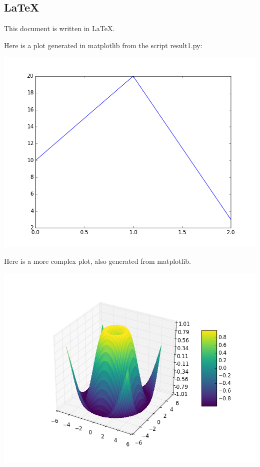 \documentclass[11pt,a4paper]{article}
\begin{document}
\subsection{LaTeX}




This document is written in \LaTeX.

Here is a plot generated in matplotlib from the script result1.py:

\includegraphics[scale=0.5]{fig/plot1.png}

Here is a more complex plot, also generated from matplotlib. 

\includegraphics[scale=0.5]{fig/plot2.png}
\end{document}
